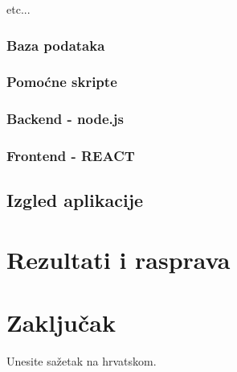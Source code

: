 \documentclass[zavrsnirad]{fer}
\begin{document}
etc...

\subsection{Baza podataka}
\label{sec:baza}

\subsection{Pomoćne skripte}

\subsection{Backend - node.js}

\subsection{Frontend - REACT}
\label{sec:frontend}

\section{Izgled aplikacije}


\chapter{Rezultati i rasprava}
\label{pog:rezultati_i_rasprava}


\chapter{Zaključak}
\label{pog:zakljucak}




\nocite{*}




\begin{sazetak}
  Unesite sažetak na hrvatskom.

  \blindtext
\end{sazetak}
\end{document}
